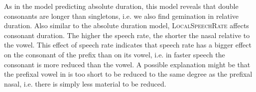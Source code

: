 \begin{table}[h!]
	\caption{ Summary of linear model for variables predicting the Box-Cox-transformed relative duration of [m]  in prefixed words}
	\label{tbl: summary model rel du in corpus}
	\begin{center}
	\end{center}


\end{table}


As in the model predicting absolute duration, this model reveals that double consonants are longer than singletons, i.e. we also find gemination in relative duration. Also similar to the absolute duration model, \textsc{LocalSpeechRate} affects consonant duration. The higher the speech rate, the shorter the nasal relative to the vowel. This effect of speech rate indicates that speech rate has a bigger effect on the consonant of the prefix  than on its vowel, i.e. in faster speech the consonant is more reduced than the vowel. A possible explanation might be that the prefixal vowel in  is too short to be reduced to the same degree as the prefixal nasal, i.e. there is simply less material to be reduced.


